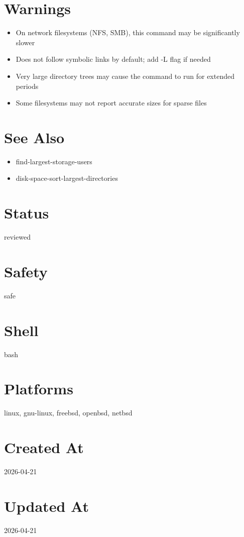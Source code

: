 \documentclass[openany]{book}
\begin{document}
\section*{Warnings}
\begin{itemize}
  \item On network filesystems (NFS, SMB), this command may be significantly slower
  \item Does not follow symbolic links by default; add -L flag if needed
  \item Very large directory trees may cause the command to run for extended periods
  \item Some filesystems may not report accurate sizes for sparse files
\end{itemize}

\section*{See Also}
\begin{itemize}
  \item find-largest-storage-users
  \item disk-space-sort-largest-directories
\end{itemize}

\section*{Status}
reviewed

\section*{Safety}
safe

\section*{Shell}
bash

\section*{Platforms}
linux, gnu-linux, freebsd, openbsd, netbsd

\section*{Created At}
2026-04-21

\section*{Updated At}
2026-04-21
\end{document}
